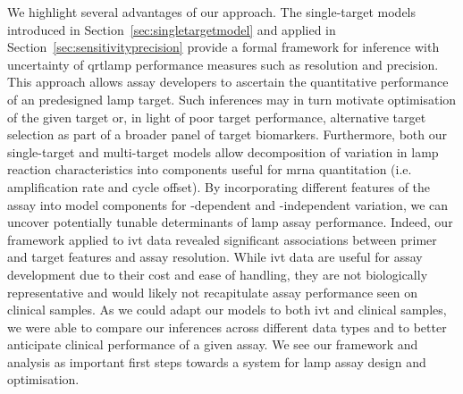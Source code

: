 \documentclass[../thesis.tex]{subfiles}
\begin{document}
We highlight several advantages of our approach. The single-target models introduced in Section~\ref{sec:singletargetmodel} and applied in Section~\ref{sec:sensitivityprecision} provide a formal framework for inference with uncertainty of \gls{qrtlamp} performance measures such as resolution and precision. This approach allows assay developers to ascertain the quantitative performance of an predesigned \gls{lamp} target. Such inferences may in turn motivate optimisation of the given target or, in light of poor target performance, alternative target selection as part of a broader panel of target biomarkers. Furthermore, both our single-target and multi-target models allow decomposition of variation in \gls{lamp} reaction characteristics into components useful for \gls{mrna} quantitation (i.e. amplification rate and cycle offset). By incorporating different features of the assay into model components for -dependent and -independent variation, we can uncover potentially tunable determinants of \gls{lamp} assay performance. Indeed, our framework applied to \gls{ivt}  data revealed significant associations between primer and target features and assay resolution. While \gls{ivt}  data are useful for assay development due to their cost and ease of handling, they are not biologically representative and would likely not recapitulate assay performance seen on clinical samples. As we could adapt our models to both \gls{ivt}  and clinical samples, we were able to compare our inferences across different data types and to better anticipate clinical performance of a given assay. We see our framework and analysis as important first steps towards a system for \gls{lamp} assay design and optimisation.
\end{document}
